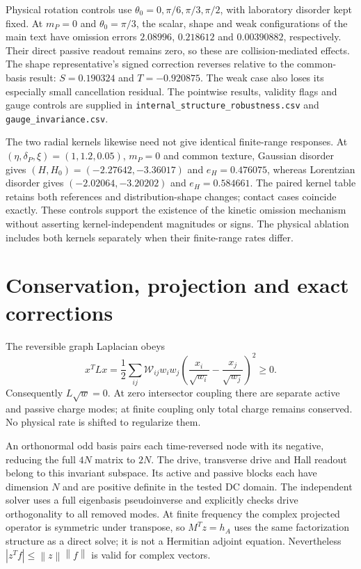 \documentclass[11pt]{article}
\newcommand{\norm}[1]{\left\lVert#1\right\rVert}
\begin{document}
Physical rotation controls use $\theta_0=0,\pi/6,\pi/3,\pi/2$, with laboratory disorder kept fixed. At $m_P=0$ and $\theta_0=\pi/3$, the scalar, shape and weak configurations of the main text have omission errors $2.08996$, $0.218612$ and $0.00390882$, respectively. Their direct passive readout remains zero, so these are collision-mediated effects. The shape representative's signed correction reverses relative to the common-basis result: $S=0.190324$ and $T=-0.920875$. The weak case also loses its especially small cancellation residual. The pointwise results, validity flags and gauge controls are supplied in \texttt{internal\_structure\_robustness.csv} and \texttt{gauge\_invariance.csv}.

The two radial kernels likewise need not give identical finite-range responses. At $(\eta,\delta_P,\xi)=(1,1.2,0.05)$, $m_P=0$ and common texture, Gaussian disorder gives $(H,H_0)=(-2.27642,-3.36017)$ and $e_H=0.476075$, whereas Lorentzian disorder gives $(-2.02064,-3.20202)$ and $e_H=0.584661$. The paired kernel table retains both references and distribution-shape changes; contact cases coincide exactly. These controls support the existence of the kinetic omission mechanism without asserting kernel-independent magnitudes or signs. The physical ablation includes both kernels separately when their finite-range rates differ.

\section{Conservation, projection and exact corrections}
The reversible graph Laplacian obeys
\begin{equation}
x^TLx=\frac12\sum_{ij}\mathcal W_{ij}w_iw_j
\left(\frac{x_i}{\sqrt{w_i}}-\frac{x_j}{\sqrt{w_j}}\right)^2\geq0.
\end{equation}
Consequently $L\sqrt w=0$. At zero intersector coupling there are separate active and passive charge modes; at finite coupling only total charge remains conserved. No physical rate is shifted to regularize them.

An orthonormal odd basis pairs each time-reversed node with its negative, reducing the full $4N$ matrix to $2N$. The drive, transverse drive and Hall readout belong to this invariant subspace. Its active and passive blocks each have dimension $N$ and are positive definite in the tested DC domain. The independent solver uses a full eigenbasis pseudoinverse and explicitly checks drive orthogonality to all removed modes. At finite frequency the complex projected operator is symmetric under transpose, so $M^Tz=h_A$ uses the same factorization structure as a direct solve; it is not a Hermitian adjoint equation. Nevertheless $|z^Tf|\leq\norm z\norm f$ is valid for complex vectors.
\end{document}
